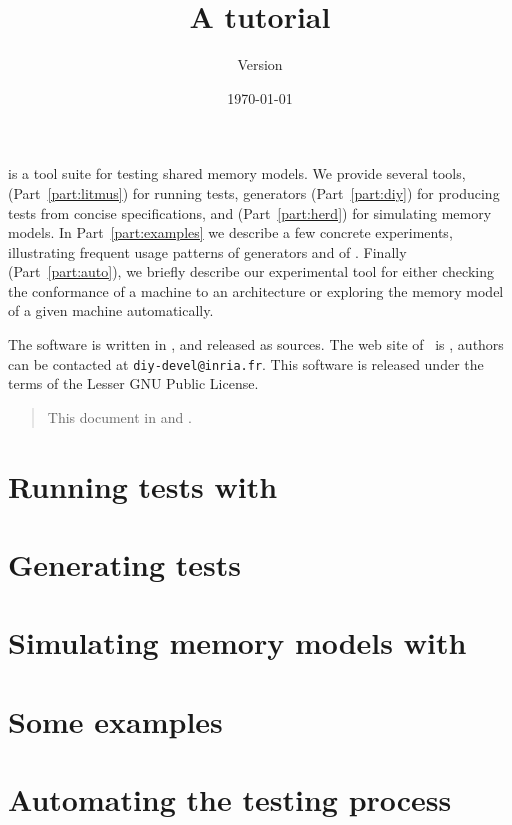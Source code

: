 \documentclass{article}
\title{A \prog{don't (diy)} tutorial}
\author{Version \version}
\date{\today}
\begin{document}
\maketitle

\diy{} is a tool suite for testing shared memory models.  We
provide several tools,  (Part~\ref{part:litmus}) for running tests,
\diy{} generators (Part~\ref{part:diy}) for producing tests from concise
specifications, and
\herd{} (Part~\ref{part:herd}) for simulating memory models.
In Part~\ref{part:examples} we describe
a few concrete experiments, illustrating frequent usage patterns of
\diy{} generators and of \litmus.
Finally (Part~\ref{part:auto}), we briefly
describe our experimental \dont{} tool
for either checking the
conformance of a machine to an architecture or exploring the memory model of a
given machine automatically.

The software is written in
, and released as
sources.  The web site of~\diy{} is
, authors can be contacted at
\texttt{diy-devel@inria.fr}.
This software is released under the terms of the Lesser GNU Public License.

\begin{htmlonly}
\begin{quote}
This document in  and .
\end{quote}
\end{htmlonly}

\tableofcontents
\cutend

\clearpage
\part{Running\label{part:litmus} tests with }


\clearpage
\part{Generating\label{part:diy} tests}


\clearpage
\part{Simulating\label{part:herd} memory models with \herd}


\clearpage
\part{Some \label{part:examples} examples}


\clearpage
\part{Automating\label{part:auto} the testing process}




\end{document}
